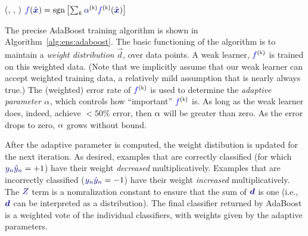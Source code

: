 %
  {(\FUN{$\cW$}, \VAR{$\cD$}, )}%
  {
\ENDFOR
\RETURN $\FUNm{f}(\VARm{\hat \vx}) = \sgn\left[ \sum_k \VARm{\al\kth} \FUNm{f\kth}(\VARm{\hat\vx}) \right]$
}

The precise AdaBoost training algorithm is shown in
Algorithm~\ref{alg:ens:adaboost}.  The basic functioning of the
algorithm is to maintain a \emph{weight distribution} $\vec d$, over
data points.  A weak learner, $\FUNm{f\kth}$ is trained on this
weighted data.  (Note that we implicitly assume that our weak learner
can accept weighted training data, a relatively mild assumption that
is nearly always true.)  The (weighted) error rate of $\FUNm{f\kth}$
is used to determine the \emph{adaptive parameter} $\alpha$, which
controls how ``important'' $\FUNm{f\kth}$ is.  As long as the weak
learner does, indeed, achieve $<50\%$ error, then $\alpha$ will be
greater than zero.  As the error drops to zero, $\alpha$ grows without
bound.


After the adaptive parameter is computed, the weight distibution is
updated for the next iteration.  As desired, examples that are
correctly classified (for which $\VARm{y_n} \VARm{\hat y_n} = +1$)
have their weight \emph{decreased} multiplicatively.  Examples that
are incorrectly classified ($\VARm{y_n} \VARm{\hat y_n} = -1$) have
their weight \emph{increased} multiplicatively.  The $\VARm{Z}$ term
is a nomralization constant to ensure that the sum of $\VARm{\vec d}$
is one (i.e., $\VARm{\vec d}$ can be interpreted as a distribution).
The final classifier returned by AdaBoost is a weighted vote of the
individual classifiers, with weights given by the adaptive parameters.


